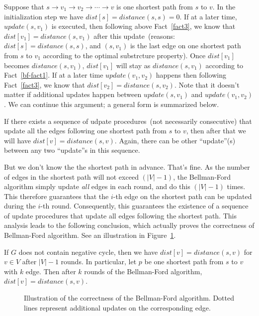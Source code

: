 Suppose that $s \to v_1 \to v_2 \to \cdots \to v$ is one shortest path from $s$ to $v$.
In the initialization step we have $dist[s] = distance(s,s) = 0$. 
If at a later time, $update(s, v_1)$ is executed, then following above Fact~\ref{fact3}, 
we know that $dist[v_1] = distance(s, v_1)$ after this update~(reasons: $dist[s] = distance(s,s)$,
and $(s,v_1)$ is the last edge on one shortest path from $s$ to $v_1$ according to the optimal substrcture property).
Once $dist[v_1]$ becomes $distance(s,v_1)$, $dist[v_1]$ will stay as $distance(s,v_1)$ according to Fact~\ref{bf-fact1}.
If at a later time $update(v_1, v_2)$ happens 
then following Fact~\ref{fact3}, we know that $dist[v_2] = distance(s, v_2)$.
Note that it doesn't matter if additional updates happen between $update(s, v_1)$ and $update(v_1, v_2)$.
We can continue this argument; a general form is summarized below.

\begin{fact}
\label{fact4}
If there exists a sequence of udpate procedures~(not necessarily consecutive) that update all the edges following one shortest path
from $s$ to $v$, then after that we will have $dist[v] = distance(s, v)$.
Again, there can be other ``update''(s) between any two ``update''s in this sequence.
\end{fact}


But we don't know the the shortest path in advance. That's fine.
As the number of edges in the shortest path will not exceed $(|V| - 1)$, the Bellman-Ford algorithm
simply update \emph{all} edges in each round, and do this $(|V| - 1)$ times.
This therefore guarantees that the $i$-th edge on the shortest path can be updated during the $i$-th round.
Consequently, this guarantees the existence of a sequence of update procedures that update all edges following the shortest path.
This analysis leads to the following conclusion, which actually proves the correctness of Bellman-Ford algorithm.
See an illustration in Figure~\ref{fig:bellman}.
\begin{fact}
\label{fact5}
If $G$ does not contain negative cycle,  then we have $dist[v] = distance(s,v)$ for $v\in V$ after $|V| -1$ rounds.
In particular, let $p$ be one shortest path from $s$ to $v$ with $k$ edge.  
Then after $k$ rounds of the Bellman-Ford algorithm, $dist[v] = distance(s,v)$.
\end{fact}

\begin{figure}[h]
\centering{}
\caption{Illustration of the correctness of the Bellman-Ford algorithm.
Dotted lines represent additional updates on the corresponding edge.}
\label{fig:bellman}
\end{figure}



